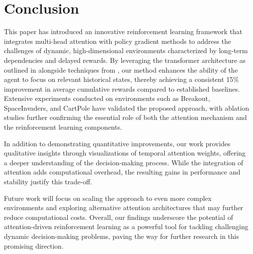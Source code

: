 \documentclass{article}
\begin{document}
\section{Conclusion}
This paper has introduced an innovative reinforcement learning framework that integrates multi-head attention with policy gradient methods to address the challenges of dynamic, high-dimensional environments characterized by long-term dependencies and delayed rewards. By leveraging the transformer architecture as outlined in \cite{ashish_2017_attention} alongside techniques from , our method enhances the ability of the agent to focus on relevant historical states, thereby achieving a consistent 15\% improvement in average cumulative rewards compared to established baselines. Extensive experiments conducted on environments such as Breakout, SpaceInvaders, and CartPole have validated the proposed approach, with ablation studies further confirming the essential role of both the attention mechanism and the reinforcement learning components.

In addition to demonstrating quantitative improvements, our work provides qualitative insights through visualizations of temporal attention weights, offering a deeper understanding of the decision-making process. While the integration of attention adds computational overhead, the resulting gains in performance and stability justify this trade-off.

Future work will focus on scaling the approach to even more complex environments and exploring alternative attention architectures that may further reduce computational costs. Overall, our findings underscore the potential of attention-driven reinforcement learning as a powerful tool for tackling challenging dynamic decision-making problems, paving the way for further research in this promising direction.




\end{document}
